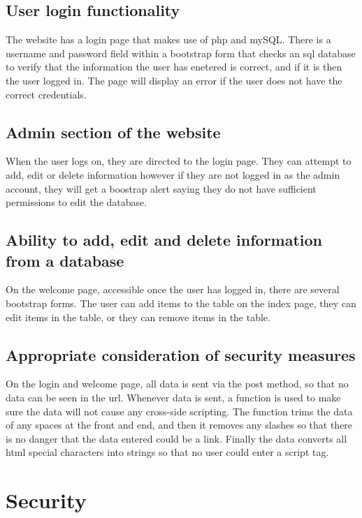 \documentclass[12pt,a4paper]{article}
\begin{document}
		\subsection{User login functionality}
		The website has a login page that makes use of php and mySQL. There is a username and password field within a bootstrap form that checks an sql database to verify that the information the user has enetered is correct, and if it is then the user logged in. The page will display an error if the user does not have the correct credentials.

		\subsection{Admin section of the website}
		When the user logs on, they are directed to the login page. They can attempt to add, edit or delete information however if they are not logged in as the admin account, they will get a boostrap alert saying they do not have sufficient permissions to edit the database.

		\subsection{Ability to add, edit and delete information from a database}
		On the welcome page, accessible once the user has logged in, there are several bootstrap forms. The user can add items to the table on the index page, they can edit items in the table, or they can remove items in the table.

		\subsection{Appropriate consideration of security measures}
		On the login and welcome page, all data is sent via the post method, so that no data can be seen in the url. Whenever data is sent, a function is used to make sure the data will not cause any cross-side scripting. The function trims the data of any spaces at the front and end, and then it removes any slashes so that there is no danger that the data entered could be a link. Finally the data converts all html special characters into strings so that no user could enter a script tag.

	\clearpage


	\section{Security}
\end{document}
